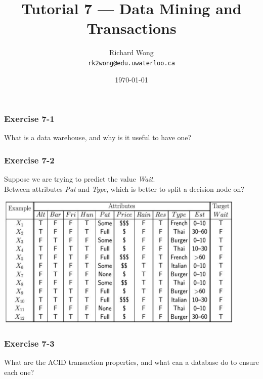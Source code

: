 

\def\ojoin{\setbox0=\hbox{$\bowtie$}%
  \rule[-.02ex]{.25em}{.4pt}\llap{\rule[\ht0]{.25em}{.4pt}}}
\def\leftouterjoin{\mathbin{\ojoin\mkern-5.8mu\bowtie}}

\title{Tutorial 7 --- Data Mining and Transactions }

\author{Richard Wong \\ \small \texttt{rk2wong@edu.uwaterloo.ca}}
\date{\today}




\begin{frame}
  \titlepage

\end{frame}


\begin{frame}
\frametitle{Exercise 7-1}

What is a data warehouse, and why is it useful to have one?

\end{frame}


\begin{frame}
\frametitle{Exercise 7-2}

Suppose we are trying to predict the value \textit{Wait}. \\
Between attributes \textit{Pat} and \textit{Type}, which is better to split a decision node on?

\begin{center}
  \includegraphics[width=0.9\textwidth]{images/decision_matrix.png}
\end{center}

\end{frame}


\begin{frame}
\frametitle{Exercise 7-3}

What are the ACID transaction properties, and what can a database do to ensure each one?

\end{frame}


